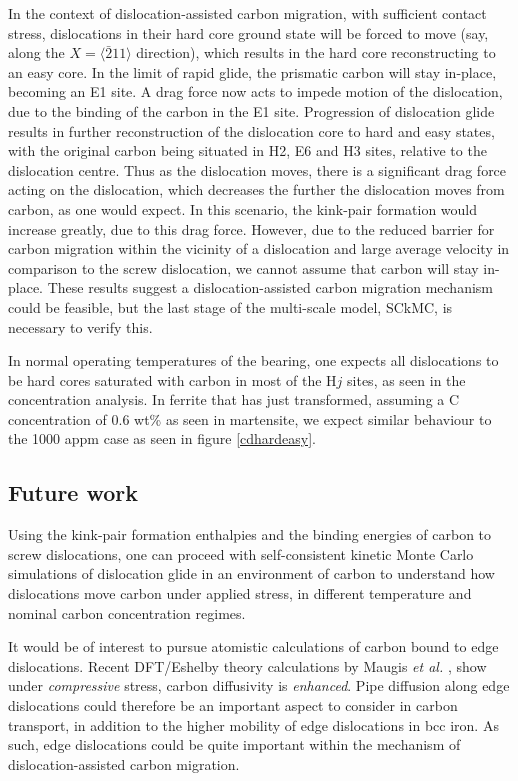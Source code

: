 \documentclass[a4paper,11pt]{article}
\numberwithin{equation}{chapter}
\numberwithin{listing}{chapter}
\begin{document}
In the context of dislocation-assisted carbon migration, with sufficient contact
stress, dislocations in their hard core ground state will be forced to move (say,
along the \(X = \langle\bar{2}11\rangle\) direction), which results in the hard core
reconstructing to an easy core. In the limit of rapid glide, the prismatic carbon will
stay in-place, becoming an E1 site. A drag force now acts to impede motion of the
dislocation, due to the binding of the carbon in the E1 site. Progression of
dislocation glide results in further reconstruction of the dislocation core to hard
and easy states, with the original carbon being situated in H2, E6 and H3 sites,
relative to the dislocation centre. Thus as the dislocation moves, there is a
significant drag force acting on the dislocation, which decreases the further the
dislocation moves from carbon, as one would expect. In this scenario, the kink-pair
formation would increase greatly, due to this drag force. However, due to the reduced
barrier for carbon migration within the vicinity of a dislocation and large average
velocity in comparison to the screw dislocation, we cannot assume that carbon will
stay in-place. These results suggest a dislocation-assisted carbon migration mechanism could be
feasible, but the last stage of the multi-scale model, SCkMC, is necessary to verify
this.



In normal operating temperatures of the bearing, one expects all dislocations to be hard cores
saturated with carbon in most of the \(\text{H}j\) sites, as seen in
the concentration analysis. In ferrite that has just transformed, assuming a C concentration of
0.6 wt\% as seen in martensite, we expect similar behaviour to the 1000 appm case as seen in
figure \ref{cdhardeasy}.



\subsection{Future work}
\label{sec:orgf0454ed}

Using the kink-pair formation enthalpies and the binding energies of carbon to screw dislocations, one can proceed
with self-consistent kinetic Monte Carlo simulations of dislocation glide in an environment of carbon to
understand how dislocations move carbon under applied stress, in different temperature
and nominal carbon concentration regimes.


It would be of interest to pursue atomistic calculations of carbon bound to edge
dislocations. Recent DFT/Eshelby theory calculations by Maugis \emph{et al.} \cite{Maugis2020}, show
under \emph{compressive} stress, carbon diffusivity is \emph{enhanced}. Pipe diffusion along edge
dislocations could therefore be an important aspect to consider in carbon transport, in addition
to the higher mobility of edge dislocations in bcc iron. As such, edge dislocations could be quite
important within the mechanism of dislocation-assisted carbon migration.
\end{document}
